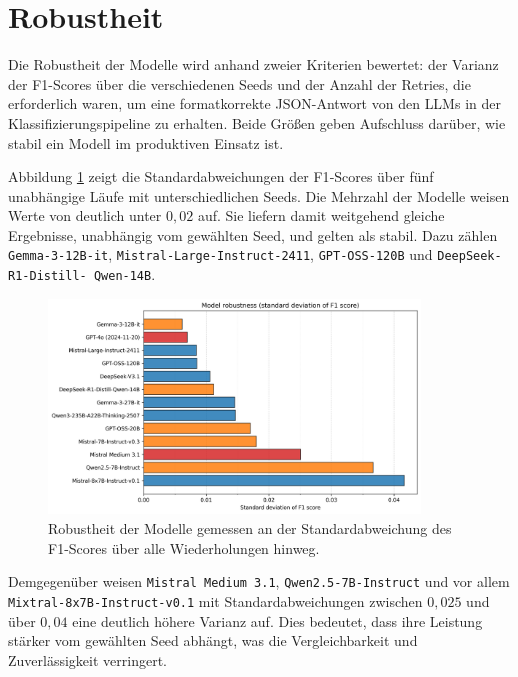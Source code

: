 \section{Robustheit}\label{sec:robustheit}

Die Robustheit der Modelle wird anhand zweier Kriterien bewertet: der Varianz der F1-Scores über die verschiedenen Seeds und der Anzahl der Retries, die erforderlich waren, um eine formatkorrekte JSON-Antwort von den \acp{LLM} in der Klassifizierungspipeline zu erhalten. Beide Größen geben Aufschluss darüber, wie stabil ein Modell im produktiven Einsatz ist.

Abbildung \ref{fig:results-evaluation-robustness-f1-std} zeigt die Standardabweichungen der F1‑Scores über fünf unabhängige Läufe mit unterschiedlichen Seeds. Die Mehrzahl der Modelle weisen Werte von deutlich unter $0{,}02$ auf. Sie liefern damit weitgehend gleiche Ergebnisse, unabhängig vom gewählten Seed, und gelten als stabil. Dazu zählen \texttt{Gemma-3-12B-it}, \texttt{Mistral-Large-Instruct-2411}, \texttt{GPT-OSS-120B} und \texttt{DeepSeek-R1-Distill-\linebreak~Qwen-14B}.

\begin{figure}[h]
    \centering
    \includegraphics[width=0.88\textwidth]{images/results/evaluation_robustness_f1_std_en}
    \caption{Robustheit der Modelle gemessen an der Standardabweichung des F1-Scores über alle Wiederholungen hinweg.}
    \label{fig:results-evaluation-robustness-f1-std}
\end{figure}

Demgegenüber weisen \texttt{Mistral Medium 3.1}, \texttt{Qwen2.5-7B-Instruct} und vor allem \texttt{Mixtral-8x7B-Instruct-v0.1} mit Standardabweichungen zwischen $0{,}025$ und über $0{,}04$ eine deutlich höhere Varianz auf. Dies bedeutet, dass ihre Leistung stärker vom gewählten Seed abhängt, was die Vergleichbarkeit und Zuverlässigkeit verringert.

